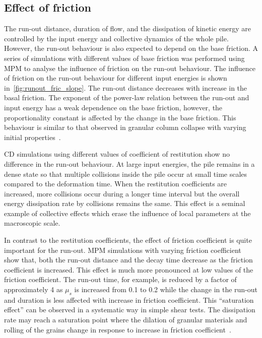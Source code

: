 \documentclass[3p,times,procedia,number]{elsarticle}
\begin{document}
\subsection{Effect of friction}
\label{sec:parameters}

The run-out distance, duration of flow, and the dissipation of kinetic energy 
are controlled by the input energy and collective dynamics of the whole pile. 
However, the run-out behaviour is also expected to depend on the base friction. 
A series of simulations with different values of base friction was performed 
using MPM to analyse the influence of friction on the run-out behaviour. The 
influence of friction on the run-out behaviour for different input energies is 
shown in~\cref{fig:runout_fric_slope}. The run-out distance decreases with 
increase in the basal friction. The exponent of the 
power-law relation between the run-out and input energy has a weak dependence 
on the base friction, however, the proportionality constant is affected by the 
change in the base friction. This behaviour is similar to that observed in 
granular column collapse with varying initial 
properties~\citep{Balmforth2005,Lajeunesse2005}. 

CD simulations using different values of coefficient of restitution show no 
difference in the run-out behaviour. At large input energies, the pile remains 
in a dense state so that multiple collisions inside the pile occur at small 
time scales compared to the deformation time. When the restitution coefficients 
are increased, more collisions occur during a longer time interval but the 
overall energy dissipation rate by collisions remains the same. This effect is 
a seminal example of collective effects which erase the influence of local 
parameters at the macroscopic scale.

In contrast to the restitution coefficients, the effect of friction 
coefficient is quite important for the run-out. MPM simulations with 
varying friction coefficient show that, both the run-out distance and the 
decay time decrease as the friction coefficient is increased. This 
effect is much more pronounced at low values of the friction coefficient. 
The run-out time, for example, is reduced by a factor of approximately 4 as 
$\mu_s$ is increased from 0.1 to 0.2 while the change in the run-out and 
duration is less affected with increase in friction coefficient. This 
``saturation effect'' can be observed in a systematic way in simple shear 
tests. The dissipation rate may reach a saturation point where the dilation of 
granular materials and rolling of the grains change in response to increase in 
friction coefficient~\citep{Estrada2008}.
\end{document}
